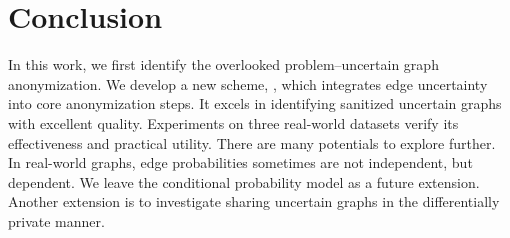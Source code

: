 \section{Conclusion}
In this work, we first identify the overlooked problem–uncertain graph anonymization. 
We develop a new scheme, {\methodName}, which integrates edge uncertainty into core anonymization steps.  
It excels in identifying sanitized uncertain graphs with excellent quality. 
Experiments on three real-world datasets verify its effectiveness and practical utility.
There are many potentials to explore further.  
In real-world graphs, edge probabilities sometimes are not independent, but dependent.  
We leave the conditional probability model as a future extension. 
Another extension is to investigate sharing uncertain graphs in the differentially private manner.